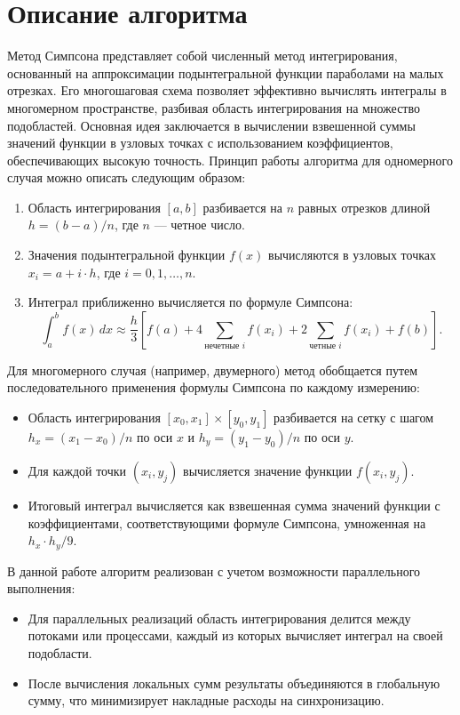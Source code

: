 \documentclass[12pt]{article}
\begin{document}
\section{Описание алгоритма}
Метод Симпсона представляет собой численный метод интегрирования, основанный на аппроксимации подынтегральной функции параболами на малых отрезках. Его многошаговая схема позволяет эффективно вычислять интегралы в многомерном пространстве, разбивая область интегрирования на множество подобластей. Основная идея заключается в вычислении взвешенной суммы значений функции в узловых точках с использованием коэффициентов, обеспечивающих высокую точность.
Принцип работы алгоритма для одномерного случая можно описать следующим образом:
\begin{enumerate}
\item Область интегрирования $[a, b]$ разбивается на $n$ равных отрезков длиной $h = (b - a) / n$, где $n$ — четное число.
\item Значения подынтегральной функции $f(x)$ вычисляются в узловых точках $x_i = a + i \cdot h$, где $i = 0, 1, \dots, n$.
\item Интеграл приближенно вычисляется по формуле Симпсона:
$$\int_a^b f(x) \, dx \approx \frac{h}{3} \left[ f(a) + 4 \sum_{\text{нечетные } i} f(x_i) + 2 \sum_{\text{четные } i} f(x_i) + f(b) \right].$$
\end{enumerate}
Для многомерного случая (например, двумерного) метод обобщается путем последовательного применения формулы Симпсона по каждому измерению:
\begin{itemize}
\item Область интегрирования $[x_0, x_1] \times [y_0, y_1]$ разбивается на сетку с шагом $h_x = (x_1 - x_0) / n$ по оси $x$ и $h_y = (y_1 - y_0) / n$ по оси $y$.
\item Для каждой точки $(x_i, y_j)$ вычисляется значение функции $f(x_i, y_j)$.
\item Итоговый интеграл вычисляется как взвешенная сумма значений функции с коэффициентами, соответствующими формуле Симпсона, умноженная на $h_x \cdot h_y / 9$.
\end{itemize}
В данной работе алгоритм реализован с учетом возможности параллельного выполнения:
\begin{itemize}
\item Для параллельных реализаций область интегрирования делится между потоками или процессами, каждый из которых вычисляет интеграл на своей подобласти.
\item После вычисления локальных сумм результаты объединяются в глобальную сумму, что минимизирует накладные расходы на синхронизацию.
\end{itemize}
\end{document}
